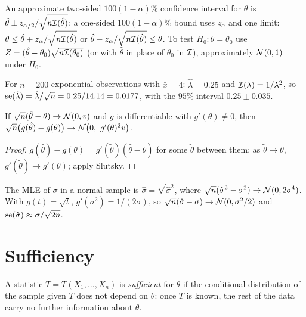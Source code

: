 \begin{corollary}\label{cor:wald}
An approximate two-sided $100(1-\alpha)\%$ confidence interval for $\theta$ is $\hat\theta\pm z_{\alpha/2}/\sqrt{n\mathcal{I}(\hat\theta)}$; a one-sided $100(1-\alpha)\%$ bound uses $z_\alpha$ and one limit: $\theta\le\hat\theta+z_\alpha/\sqrt{n\mathcal{I}(\hat\theta)}$ or $\hat\theta-z_\alpha/\sqrt{n\mathcal{I}(\hat\theta)}\le\theta$. To test $H_0:\theta=\theta_0$ use $Z=(\hat\theta-\theta_0)\sqrt{n\mathcal{I}(\theta_0)}$ (or with $\hat\theta$ in place of $\theta_0$ in $\mathcal{I}$), approximately $\mathcal{N}(0,1)$ under $H_0$.
\end{corollary}

\begin{example}
For $n=200$ exponential observations with $\bar{x}=4$: $\hat\lambda=0.25$ and $\mathcal{I}(\lambda)=1/\lambda^2$, so $\operatorname{se}(\hat\lambda)=\hat\lambda/\sqrt n=0.25/14.14=0.0177$, with the $95\%$ interval $0.25\pm0.035$.
\end{example}

\begin{theorem}\label{thm:delta}
If $\sqrt n(\hat\theta-\theta)\to\mathcal{N}(0,v)$ and $g$ is differentiable with $g'(\theta)\ne0$, then $\sqrt n\big(g(\hat\theta)-g(\theta)\big)\to\Normal\big(0,\ g'(\theta)^2v\big)$.
\end{theorem}

\begin{proof}
$g(\hat\theta)-g(\theta)=g'(\tilde\theta)(\hat\theta-\theta)$ for some $\tilde\theta$ between them; as $\tilde\theta\to\theta$, $g'(\tilde\theta)\to g'(\theta)$; apply Slutsky.
\end{proof}

\begin{example}
The MLE of $\sigma$ in a normal sample is $\hat\sigma=\sqrt{\hat\sigma^2}$, where $\sqrt n(\hat\sigma^2-\sigma^2)\to\mathcal{N}(0,2\sigma^4)$. With $g(t)=\sqrt t$, $g'(\sigma^2)=1/(2\sigma)$, so $\sqrt n(\hat\sigma-\sigma)\to\mathcal{N}(0,\sigma^2/2)$ and $\operatorname{se}(\hat\sigma)\approx\sigma/\sqrt{2n}$.
\end{example}

\section{Sufficiency}

\begin{definition}
A statistic $T=T(X_1,\dots,X_n)$ is \emph{sufficient} for $\theta$ if the conditional distribution of the sample given $T$ does not depend on $\theta$: once $T$ is known, the rest of the data carry no further information about $\theta$.
\end{definition}

